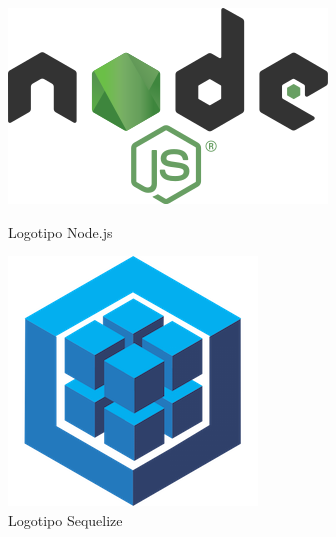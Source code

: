 \documentclass[11pt,spanish,listoffigures,listoftables]{tfgetsinf}
\begin{document}
\begin{figure}[!htb]
     \includegraphics[width=\linewidth]{img/Node.js_logo.png}
     \caption{Logotipo Node.js}\label{fig:LogoNode}
  \endminipage\hfill
     \includegraphics[width=\linewidth]{img/Sequelize_logo.png}
     \caption{Logotipo Sequelize}\label{fig:LogoSequelize}
  \endminipage\hfill

\end{figure}
\end{document}
